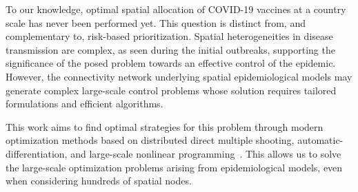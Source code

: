 To our knowledge, optimal spatial allocation of COVID-19 vaccines at a country scale has never been performed yet. This question is distinct from, and complementary to, risk-based prioritization. Spatial heterogeneities in disease transmission are complex, as seen during the initial outbreaks\cite{Gatto:SpreadDynamicsCOVID19:2020,Bertuzzo:GeographyCOVID19Spread:2020,Li:SubstantialUndocumentedInfection:2020}, supporting the significance of the posed problem towards an effective control of the epidemic. However, the connectivity network underlying spatial epidemiological models may generate complex large-scale control problems whose solution requires tailored formulations and efficient algorithms.  

This work aims to find optimal strategies for this problem through modern optimization methods based on distributed direct multiple shooting, automatic-differentiation, and large-scale nonlinear programming~\cite{Bock:MultipleShootingAlgorithm:1984,Savorgnan:MultipleShootingDistributed:2011,Andersson:CasADiSoftwareFramework:2018,Wachter:ImplementationInteriorpointFilter:2006}. This allows us to solve the large-scale optimization problems arising from epidemiological models, even when considering hundreds of spatial nodes. 


